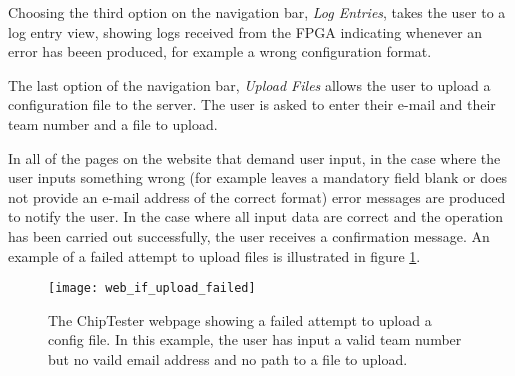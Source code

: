 Choosing the third option on the navigation bar, \textit{Log Entries}, takes the user to a log entry view, showing logs received from the FPGA indicating whenever an error has beeen produced, for example a wrong configuration format.

The last option of the navigation bar, \textit{Upload Files} allows the user to upload a configuration file to the server. The user is asked to enter their e-mail and their team number and a file to upload.

In all of the pages on the website that demand user input, in the case where the user inputs something wrong (for example leaves a mandatory field blank or does not provide an e-mail address of the correct format) error messages are produced to notify the user. In the case where all input data are correct and the operation has been carried out successfully, the user receives a confirmation message. An example of a failed attempt to upload files is illustrated in figure \ref{fig:web_if_upload_failed}.

\begin{figure}[ht]
 \centering
 \texttt{[image: web\_if\_upload\_failed]}
 \caption{The ChipTester webpage showing a failed attempt to upload a config file. In this example, the user has input a valid team number but no vaild email address and no path to a file to upload.}
 \label{fig:web_if_upload_failed}
\end{figure}


